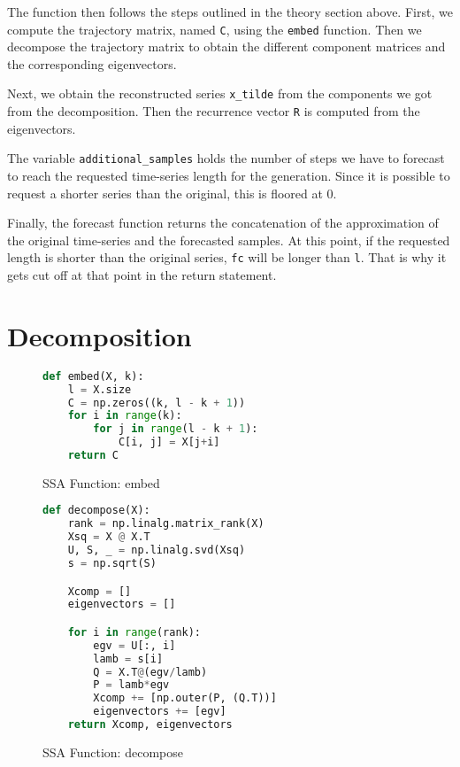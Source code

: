 The function then follows the steps outlined in the theory section above. First, we compute the trajectory matrix, named \texttt{C}, using the \texttt{embed} function. Then we decompose the trajectory matrix to obtain the different component matrices and the corresponding eigenvectors. 

Next, we obtain the reconstructed series \texttt{x\_tilde} from the components we got from the decomposition. Then the recurrence vector \texttt{R} is computed from the eigenvectors. 

The variable \texttt{additional\_samples} holds the number of steps we have to forecast to reach the requested time-series length for the generation. Since it is possible to request a shorter series than the original, this is floored at 0. 

Finally, the forecast function returns the concatenation of the approximation of the original time-series and the forecasted samples. At this point, if the requested length is shorter than the original series, \texttt{fc} will be longer than \texttt{l}. That is why it gets cut off at that point in the return statement.

\newpage

\section{Decomposition}

\begin{figure}
\begin{singlespace}
\begin{lstlisting}[language=Python]
def embed(X, k):
    l = X.size
    C = np.zeros((k, l - k + 1))
    for i in range(k):
        for j in range(l - k + 1):
            C[i, j] = X[j+i]
    return C
\end{lstlisting}
\end{singlespace}
\caption{SSA Function: embed}    
\label{fig:ssa-embed}
\end{figure}

\begin{figure}
\begin{singlespace}
\begin{lstlisting}[language=Python]
def decompose(X):
    rank = np.linalg.matrix_rank(X)
    Xsq = X @ X.T
    U, S, _ = np.linalg.svd(Xsq)
    s = np.sqrt(S)

    Xcomp = []
    eigenvectors = []

    for i in range(rank):
        egv = U[:, i]
        lamb = s[i]
        Q = X.T@(egv/lamb)
        P = lamb*egv
        Xcomp += [np.outer(P, (Q.T))]
        eigenvectors += [egv]
    return Xcomp, eigenvectors
\end{lstlisting}
\end{singlespace}
\caption{SSA Function: decompose}    
\label{fig:ssa-decompose}
\end{figure}

